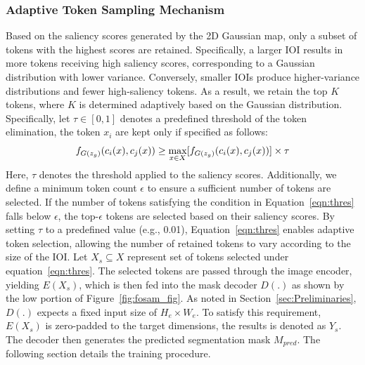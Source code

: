 \documentclass{article}
\begin{document}
\subsubsection{Adaptive Token Sampling Mechanism}
\label{sec:dynamic-window}
Based on the saliency scores generated by the 2D Gaussian map, only a subset of tokens with the highest scores are retained. Specifically, a larger IOI results in more tokens receiving high saliency scores, corresponding to a Gaussian distribution with lower variance. Conversely, smaller IOIs produce higher-variance distributions and fewer high-saliency tokens. As a result, we retain the top $K$ tokens, where $K$ is determined adaptively based on the Gaussian distribution. Specifically, let $\tau \in [0,1]$ denotes a predefined threshold of the token elimination, the token $x_{i}$ are kept only if specified as follows:
\begin{equation}
\label{eqn:thres}
\small
f_{G(z_{g})}(c_{i}(x), c_{j}(x)) \geq \max_{x\in X}[f_{G(z_{g})}(c_{i}(x), c_{j}(x))]\times \tau  
\end{equation}
Here, $\tau$ denotes the threshold applied to the saliency scores. Additionally, we define a minimum token count $\epsilon$ to ensure a sufficient number of tokens are selected. If the number of tokens satisfying the condition in Equation~\ref{eqn:thres} falls below $\epsilon$, the top-$\epsilon$ tokens are selected based on their saliency scores. By setting $\tau$ to a predefined value (e.g., 0.01), Equation~\ref{eqn:thres} enables adaptive token selection, allowing the number of retained tokens to vary according to the size of the IOI. Let $X_{s}\subseteq X$ represent set of tokens selected under equation~\ref{eqn:thres}.
The selected tokens are passed through the image encoder, yielding $E(X_s)$, which is then fed into the mask decoder $D(.)$ as shown by the low portion of Figure~\ref{fig:fosam_fig}. As noted in Section~\ref{sec:Preliminaries}, $D(.)$ expects a fixed input size of $H_e \times W_e$. To satisfy this requirement, $E(X_s)$ is zero-padded to the target dimensions, the results is denoted as $Y_s$. The decoder then generates the predicted segmentation mask $M_{pred}$. The following section details the training procedure.
\end{document}
